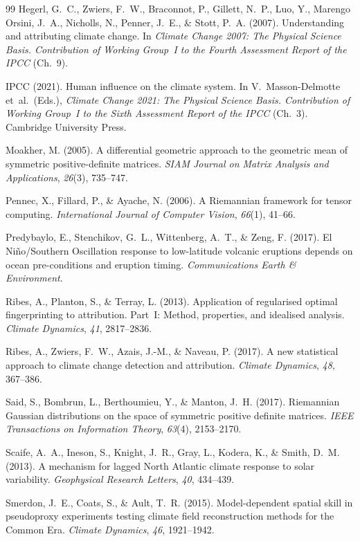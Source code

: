 \documentclass[preprint,12pt]{elsarticle}
\begin{document}
\begin{thebibliography}{99}
Hegerl, G.~C., Zwiers, F.~W., Braconnot, P., Gillett, N.~P., Luo, Y., Marengo Orsini, J.~A., Nicholls, N., Penner, J.~E., \& Stott, P.~A. (2007).
Understanding and attributing climate change.
In \textit{Climate Change 2007: The Physical Science Basis. Contribution of Working Group~I to the Fourth Assessment Report of the IPCC} (Ch.~9).

IPCC (2021).
Human influence on the climate system.
In V.~Masson-Delmotte et~al.\ (Eds.), \textit{Climate Change 2021: The Physical Science Basis. Contribution of Working Group~I to the Sixth Assessment Report of the IPCC} (Ch.~3).
Cambridge University Press.

Moakher, M. (2005).
A differential geometric approach to the geometric mean of symmetric positive-definite matrices.
\textit{SIAM Journal on Matrix Analysis and Applications}, \textit{26}(3), 735--747.

Pennec, X., Fillard, P., \& Ayache, N. (2006).
A Riemannian framework for tensor computing.
\textit{International Journal of Computer Vision}, \textit{66}(1), 41--66.

Predybaylo, E., Stenchikov, G.~L., Wittenberg, A.~T., \& Zeng, F. (2017).
El Ni\~{n}o/Southern Oscillation response to low-latitude volcanic eruptions depends on ocean pre-conditions and eruption timing.
\textit{Communications Earth \& Environment}.

Ribes, A., Planton, S., \& Terray, L. (2013).
Application of regularised optimal fingerprinting to attribution.
Part~I: Method, properties, and idealised analysis.
\textit{Climate Dynamics}, \textit{41}, 2817--2836.

Ribes, A., Zwiers, F.~W., Azais, J.-M., \& Naveau, P. (2017).
A new statistical approach to climate change detection and attribution.
\textit{Climate Dynamics}, \textit{48}, 367--386.

Said, S., Bombrun, L., Berthoumieu, Y., \& Manton, J.~H. (2017).
Riemannian Gaussian distributions on the space of symmetric positive definite matrices.
\textit{IEEE Transactions on Information Theory}, \textit{63}(4), 2153--2170.

Scaife, A.~A., Ineson, S., Knight, J.~R., Gray, L., Kodera, K., \& Smith, D.~M. (2013).
A mechanism for lagged North Atlantic climate response to solar variability.
\textit{Geophysical Research Letters}, \textit{40}, 434--439.

Smerdon, J.~E., Coats, S., \& Ault, T.~R. (2015).
Model-dependent spatial skill in pseudoproxy experiments testing climate field reconstruction methods for the Common Era.
\textit{Climate Dynamics}, \textit{46}, 1921--1942.

\end{thebibliography}
\end{document}
